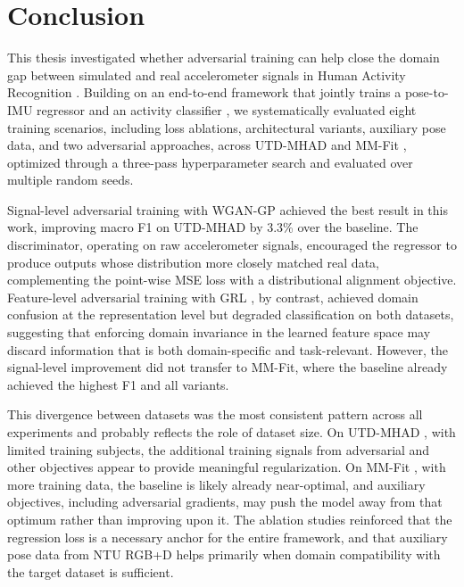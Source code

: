 \chapter{Conclusion}
\label{chap:conclusion}
{\renewcommand{\thefootnote}{}}

This thesis investigated whether adversarial training can help close the domain gap between simulated and real accelerometer signals in Human Activity Recognition \cite{lara2012survey, hammerla2016deep}. Building on an end-to-end framework that jointly trains a pose-to-IMU regressor and an activity classifier \cite{zolfaghari2024sensor}, we systematically evaluated eight training scenarios, including loss ablations, architectural variants, auxiliary pose data, and two adversarial approaches, across UTD-MHAD \cite{chen2015utd} and MM-Fit \cite{stromback2020mm}, optimized through a three-pass hyperparameter search and evaluated over multiple random seeds.

Signal-level adversarial training with WGAN-GP \cite{arjovsky2017wasserstein, gulrajani2017improved} achieved the best result in this work, improving macro F1 on UTD-MHAD by 3.3\% over the baseline. The discriminator, operating on raw accelerometer signals, encouraged the regressor to produce outputs whose distribution more closely matched real data, complementing the point-wise MSE loss with a distributional alignment objective. Feature-level adversarial training with GRL \cite{ganin2016domain}, by contrast, achieved domain confusion at the representation level but degraded classification on both datasets, suggesting that enforcing domain invariance in the learned feature space may discard information that is both domain-specific and task-relevant. However, the signal-level improvement did not transfer to MM-Fit, where the baseline already achieved the highest F1 and all variants.

This divergence between datasets was the most consistent pattern across all experiments and probably reflects the role of dataset size. On UTD-MHAD \cite{chen2015utd}, with limited training subjects, the additional training signals from adversarial and other objectives appear to provide meaningful regularization. On MM-Fit \cite{stromback2020mm}, with more training data, the baseline is likely already near-optimal, and auxiliary objectives, including adversarial gradients, may push the model away from that optimum rather than improving upon it. The ablation studies reinforced that the regression loss is a necessary anchor for the entire framework, and that auxiliary pose data from NTU RGB+D \cite{shahroudy2016ntu} helps primarily when domain compatibility with the target dataset is sufficient.

